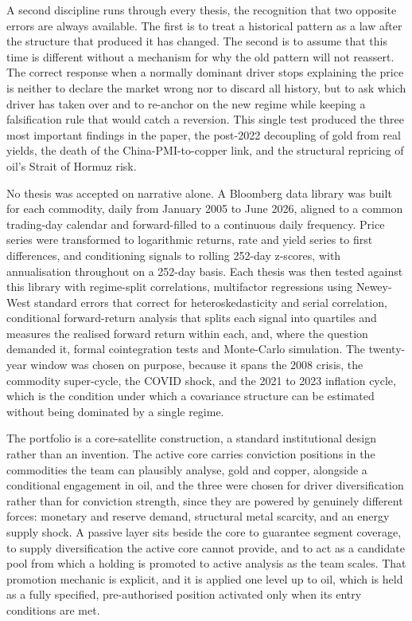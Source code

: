 \documentclass[11pt,a4paper]{article}
\begin{document}
A second discipline runs through every thesis, the recognition that two opposite errors are always available. The first is to treat a historical pattern as a law after the structure that produced it has changed. The second is to assume that this time is different without a mechanism for why the old pattern will not reassert. The correct response when a normally dominant driver stops explaining the price is neither to declare the market wrong nor to discard all history, but to ask which driver has taken over and to re-anchor on the new regime while keeping a falsification rule that would catch a reversion. This single test produced the three most important findings in the paper, the post-2022 decoupling of gold from real yields, the death of the China-PMI-to-copper link, and the structural repricing of oil's Strait of Hormuz risk.

No thesis was accepted on narrative alone. A Bloomberg data library was built for each commodity, daily from January 2005 to June 2026, aligned to a common trading-day calendar and forward-filled to a continuous daily frequency. Price series were transformed to logarithmic returns, rate and yield series to first differences, and conditioning signals to rolling 252-day z-scores, with annualisation throughout on a 252-day basis. Each thesis was then tested against this library with regime-split correlations, multifactor regressions using Newey-West standard errors that correct for heteroskedasticity and serial correlation, conditional forward-return analysis that splits each signal into quartiles and measures the realised forward return within each, and, where the question demanded it, formal cointegration tests and Monte-Carlo simulation. The twenty-year window was chosen on purpose, because it spans the 2008 crisis, the commodity super-cycle, the COVID shock, and the 2021 to 2023 inflation cycle, which is the condition under which a covariance structure can be estimated without being dominated by a single regime.

The portfolio is a core-satellite construction, a standard institutional design rather than an invention. The active core carries conviction positions in the commodities the team can plausibly analyse, gold and copper, alongside a conditional engagement in oil, and the three were chosen for driver diversification rather than for conviction strength, since they are powered by genuinely different forces: monetary and reserve demand, structural metal scarcity, and an energy supply shock. A passive layer sits beside the core to guarantee segment coverage, to supply diversification the active core cannot provide, and to act as a candidate pool from which a holding is promoted to active analysis as the team scales. That promotion mechanic is explicit, and it is applied one level up to oil, which is held as a fully specified, pre-authorised position activated only when its entry conditions are met.
\end{document}
